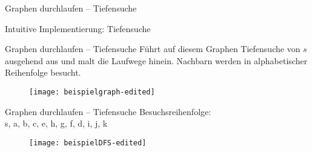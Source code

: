\begin{frame}{Graphen durchlaufen – Tiefensuche}
	\vspace{-.3\baselineskip}
	\begin{exampleblock}{Intuitive Implementierung: Tiefensuche\only<all:2>{, Release-Candidate}}
		\begin{algorithm}[H]
			\vspace{-.5\baselineskip}
		\end{algorithm}
	\end{exampleblock}
\end{frame}

\begin{frame}{Graphen durchlaufen – Tiefensuche}
	Führt auf diesem Graphen Tiefensuche von $s$ ausgehend aus und malt die Laufwege hinein. Nachbarn werden in alphabetischer Reihenfolge besucht.
	\vspace{-1.1\baselineskip}
	\begin{figure}[htp]
		\centering
		\texttt{[image: beispielgraph-edited]}
	\end{figure}
\end{frame}

\begin{frame}{Graphen durchlaufen – Tiefensuche}
	\solutionheading
	Besuchsreihenfolge: \\ s, a, b, c, e, h, g, f, d, i, j, k
	\vspace{-.4\baselineskip}
	\begin{figure}[htp]
		\centering
		\texttt{[image: beispielDFS-edited]}
	\end{figure}
\end{frame}

